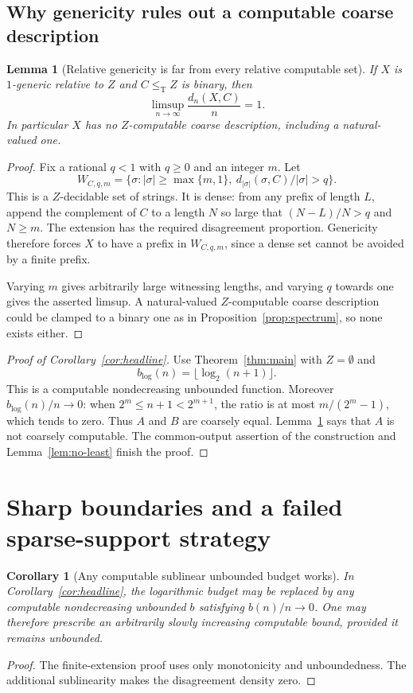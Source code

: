\documentclass[11pt,a4paper]{article}
\newcommand{\leT}{\leq_{\mathrm T}}
\newcommand{\bblog}{b_{\log}}
\newtheorem{lemma}[theorem]{Lemma}
\newtheorem{corollary}[theorem]{Corollary}
\theoremstyle{definition}\newtheorem{definition}[theorem]{Definition}
\theoremstyle{remark}\newtheorem{remark}[theorem]{Remark}
\begin{document}
\subsection{Why genericity rules out a computable coarse description}
\begin{lemma}[Relative genericity is far from every relative computable set]
\label{lem:generic-density}
If $X$ is $1$-generic relative to $Z$ and $C\leT Z$ is binary, then
\[
                 \limsup_{n\to\infty}\frac{d_n(X,C)}n=1.
\]
In particular $X$ has no $Z$-computable coarse description, including a natural-valued one.
\end{lemma}
\begin{proof}
Fix a rational $q<1$ with $q\ge0$ and an integer $m$. Let
\[
 W_{C,q,m}=\{\sigma:|\sigma|\ge\max\{m,1\},\
                  d_{|\sigma|}(\sigma,C)/|\sigma|>q\}.
\]
This is a $Z$-decidable set of strings. It is dense: from any prefix of length $L$, append the complement of $C$ to a length $N$ so large that $(N-L)/N>q$ and $N\ge m$. The extension has the required disagreement proportion. Genericity therefore forces $X$ to have a prefix in $W_{C,q,m}$, since a dense set cannot be avoided by a finite prefix.

Varying $m$ gives arbitrarily large witnessing lengths, and varying $q$ towards one gives the asserted limsup. A natural-valued $Z$-computable coarse description could be clamped to a binary one as in Proposition~\ref{prop:spectrum}, so none exists either.
\end{proof}

\begin{proof}[Proof of Corollary~\ref{cor:headline}]
Use Theorem~\ref{thm:main} with $Z=\emptyset$ and
\[
                       \bblog(n)=\lfloor\log_2(n+1)\rfloor.
\]
This is a computable nondecreasing unbounded function. Moreover $\bblog(n)/n\to0$: when $2^m\le n+1<2^{m+1}$, the ratio is at most $m/(2^m-1)$, which tends to zero. Thus $A$ and $B$ are coarsely equal. Lemma~\ref{lem:generic-density} says that $A$ is not coarsely computable. The common-output assertion of the construction and Lemma~\ref{lem:no-least} finish the proof.
\end{proof}

\section{Sharp boundaries and a failed sparse-support strategy}
\label{sec:boundaries}

\begin{corollary}[Any computable sublinear unbounded budget works]
\label{cor:any-budget}
In Corollary~\ref{cor:headline}, the logarithmic budget may be replaced by any computable nondecreasing unbounded $b$ satisfying $b(n)/n\to0$. One may therefore prescribe an arbitrarily slowly increasing computable bound, provided it remains unbounded.
\end{corollary}
\begin{proof}
The finite-extension proof uses only monotonicity and unboundedness. The additional sublinearity makes the disagreement density zero.
\end{proof}
\end{document}
